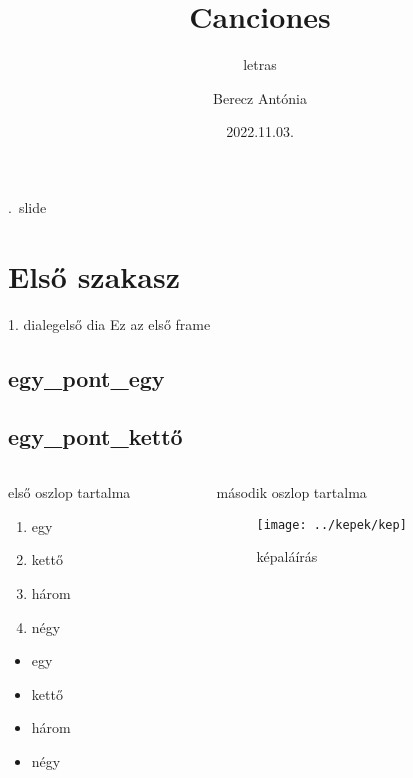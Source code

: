 \documentclass[aspectratio=169,12pt,fragile,allowframebreaks]{beamer}
\begin{document}
\author{Berecz Antónia} 
\title{Canciones} 
\subtitle{letras}  
\date{2022.11.03.} 
\maketitle 
\insertslidenumber.\ slide
\section{Első szakasz}
\begin{frame}{1. dia}{legelső dia}
Ez az első frame
\subsection{egy_pont_egy}
\hulipsum
\hulipsum
\end{frame}

\subsection{egy_pont_kettő}
\begin{columns}
\begin{column}{.5\linewidth}
első oszlop tartalma
\begin{enumerate}
\item egy
\item kettő
\item három
\item négy
\end{enumerate}
\begin{itemize}
\item<2-> egy
\item kettő
\item három
\item négy

\end{itemize}

\end{column}
\begin{column}{.5\linewidth}
második oszlop tartalma
\begin{figure}[bt]
\texttt{[image: ../kepek/kep]}
\caption{képaláírás}
\end{figure}
\end{column}
\end{columns}
\end{document}
